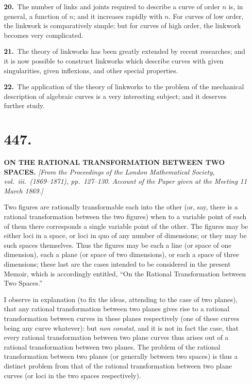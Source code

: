 \documentclass[11pt,a4paper]{article}
\begin{document}
\textbf{20.}\ The number of links and joints required to describe a curve of order $n$ is, in general, a function of $n$; and it increases rapidly with $n$. For curves of low order, the linkwork is comparatively simple; but for curves of high order, the linkwork becomes very complicated.

\textbf{21.}\ The theory of linkworks has been greatly extended by recent researches; and it is now possible to construct linkworks which describe curves with given singularities, given inflexions, and other special properties.

\textbf{22.}\ The application of the theory of linkworks to the problem of the mechanical description of algebraic curves is a very interesting subject; and it deserves further study.

\newpage
\setcounter{page}{189}

\section*{447.}
\begin{center}
\Large\textbf{ON THE RATIONAL TRANSFORMATION BETWEEN TWO SPACES.}
\medskip
\small\textit{[From the Proceedings of the London Mathematical Society, vol.\ iii.\ (1869--1871), pp.\ 127--130. Account of the Paper given at the Meeting 11 March 1869.]}
\end{center}

Two figures are rationally transformable each into the other (or, say, there is a rational transformation between the two figures) when to a variable point of each of them there corresponds a single variable point of the other. The figures may be either loci in a space, or loci in quo of any number of dimensions; or they may be such spaces themselves. Thus the figures may be each a line (or space of one dimension), each a plane (or space of two dimensions), or each a space of three dimensions; these last are the cases intended to be considered in the present Memoir, which is accordingly entitled, ``On the Rational Transformation between Two Spaces.''

I observe in explanation (to fix the ideas, attending to the case of two planes), that any rational transformation between two planes gives rise to a rational transformation between curves in these planes respectively (one of these curves being any curve whatever): but \textit{non constat}, and it is not in fact the case, that every rational transformation between two plane curves thus arises out of a rational transformation between two planes. The problem of the rational transformation between two planes (or generally between two spaces) is thus a distinct problem from that of the rational transformation between two plane curves (or loci in the two spaces respectively).
\end{document}
